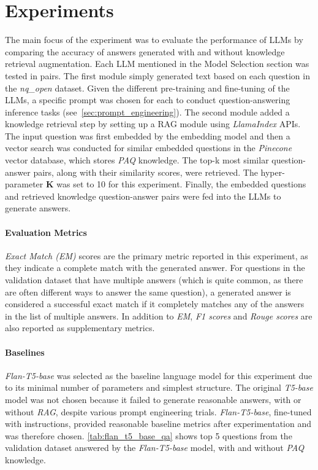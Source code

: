 \section{Experiments}

The main focus of the experiment was to evaluate the performance of LLMs by comparing the accuracy of answers generated with and without knowledge retrieval augmentation. Each LLM mentioned in the Model Selection section was tested in pairs. The first module simply generated text based on each question in the \emph{nq\_open} dataset. Given the different pre-training and fine-tuning of the LLMs, a specific prompt was chosen for each to conduct question-answering inference tasks (see~\cref{sec:prompt_engineering}). The second module added a knowledge retrieval step by setting up a RAG module using \emph{LlamaIndex} APIs. The input question was first embedded by the embedding model and then a vector search was conducted for similar embedded questions in the \emph{Pinecone} vector database, which stores \emph{PAQ} knowledge. The top-k most similar question-answer pairs, along with their similarity scores, were retrieved. The hyper-parameter \textbf{K} was set to 10 for this experiment. Finally, the embedded questions and retrieved knowledge question-answer pairs were fed into the LLMs to generate answers.



\paragraph{Evaluation Metrics} \emph{Exact Match (EM)} scores are the primary metric reported in this experiment, as they indicate a complete match with the generated answer. For questions in the validation dataset that have multiple answers (which is quite common, as there are often different ways to answer the same question), a generated answer is considered a successful exact match if it completely matches any of the answers in the list of multiple answers. In addition to \emph{EM}, \emph{F1 scores} and \emph{Rouge scores} are also reported as supplementary metrics.

\paragraph{Baselines} \emph{Flan-T5-base} was selected as the baseline language model for this experiment due to its minimal number of parameters and simplest structure. The original \emph{T5-base} model was not chosen because it failed to generate reasonable answers, with or without \emph{RAG}, despite various prompt engineering trials. \emph{Flan-T5-base}, fine-tuned with instructions, provided reasonable baseline metrics after experimentation and was therefore chosen. \cref{tab:flan_t5_base_qa} shows top 5 questions from the validation dataset answered by the \emph{Flan-T5-base} model, with and without \emph{PAQ} knowledge.